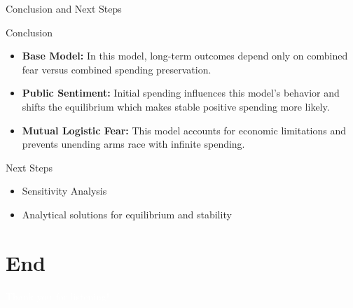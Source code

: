 \documentclass[11pt]{beamer}
\begin{document}
\begin{frame}{Conclusion and Next Steps}


    
        \begin{block}{Conclusion}
        \begin{itemize}
            \item \textbf{Base Model:} 
                In this model, long-term outcomes depend only on combined fear versus combined spending preservation.
            \item \textbf{Public Sentiment:} 
                Initial spending influences this model's behavior and shifts the equilibrium which makes stable positive spending more likely.
            \item \textbf{Mutual Logistic Fear:} This model accounts for economic limitations and prevents unending arms race with infinite spending.
        \end{itemize}
        \end{block}
       

        \begin{block}{Next Steps}
        \begin{itemize}
            \item Sensitivity Analysis
            \item Analytical solutions for equilibrium and stability
        \end{itemize}
        \end{block}
\end{frame}

\section{End}
{\BackgroundShaded
\begin{frame}
    \LARGE \textcolor{white}{Thank you for listening!}
    \footnotetext{\textcolor{white}{Presentation theme by Ricardo B. Lourenco}}
\end{frame}
}
\end{document}

